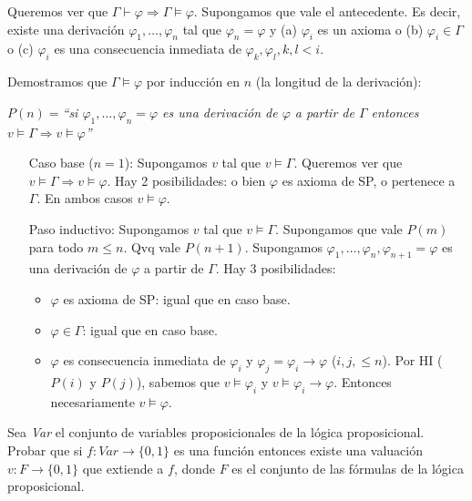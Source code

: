 \begin{questions}
\begin{solution}
 Queremos ver que $\Gamma\vdash\varphi \Rightarrow \Gamma\vDash\varphi$. Supongamos que vale el antecedente. Es decir, existe una derivaci\'on $\varphi_1, \dots, \varphi_n$ tal que $\varphi_n=\varphi$ y (a) $\varphi_i$ es un axioma o (b) $\varphi_i\in\Gamma$ o (c) $\varphi_i$ es una consecuencia inmediata de $\varphi_k,\varphi_l, k,l<i$.
 
 Demostramos que $\Gamma\vDash\varphi$ por inducci\'on en $n$ (la longitud de la derivaci\'on):
 
 \begin{center}
  $P(n)=${\it ``si $\varphi_1, \dots, \varphi_n=\varphi$ es una derivaci\'on de $\varphi$ a partir de $\Gamma$ entonces $v\vDash\Gamma\Rightarrow v\vDash\varphi$''}
 \end{center}

 \begin{enumerate}[\quad]
  \item[Caso base ($n=1$):] Supongamos $v$ tal que $v\vDash\Gamma$. Queremos ver que $v\vDash\Gamma\Rightarrow v\vDash\varphi$. Hay 2 posibilidades: o bien $\varphi$ es axioma de SP, o pertenece a $\Gamma$. En ambos casos $v\vDash\varphi$. 

  \item[Paso inductivo:] Supongamos $v$ tal que $v\vDash\Gamma$. Supongamos que vale $P(m)$ para todo $m\leq n$. Qvq vale $P(n+1)$. Supongamos $\varphi_1, \dots, \varphi_n,\varphi_{n+1}=\varphi$ es una derivaci\'on de $\varphi$ a partir de $\Gamma$. Hay 3 posibilidades: 
  \begin{itemize}
   \item $\varphi$ es axioma de SP: igual que en caso base. 
   \item $\varphi\in\Gamma$: igual que en caso base.
   \item $\varphi$ es consecuencia inmediata de $\varphi_i$ y $\varphi_j=\varphi_i\rightarrow\varphi$ ($i,j,\leq n$). Por HI ($P(i)$ y $P(j)$), sabemos que $v\vDash\varphi_i$ y $v\vDash\varphi_i\rightarrow\varphi$. Entonces necesariamente $v\vDash\varphi$.  
  \end{itemize}

 \end{enumerate}

\end{solution}

\question Sea {\it Var} el conjunto de variables proposicionales de la l\'ogica proposicional. Probar que si $f : Var \rightarrow \{0,1\}$ es una funci\'on entonces existe una valuaci\'on $v: F \rightarrow \{0,1\}$ que extiende a $f$, donde $F$ es el conjunto de las f\'ormulas de la l\'ogica proposicional. 


\end{questions}
